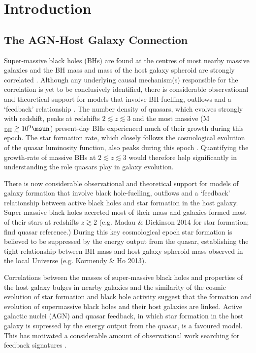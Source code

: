 
\chapter{Introduction}
\label{ch:intro}

\section{The AGN-Host Galaxy Connection}

Super-massive black holes (BHs) are found at the centres of most nearby massive galaxies and the BH mass and mass of the host galaxy spheroid are strongly correlated \citep{ferrarese00,gebhardt00,kormendy13}. 
Although any underlying causal mechanism(s) responsible for the correlation is yet to be conclusively identified, there is considerable observational and theoretical support for models that involve BH-fuelling, outflows and a `feedback' relationship \citep[e.g.][]{king15}.  
The number density of quasars, which evolves strongly with redshift, peaks at redshifts $2 \lesssim z \lesssim 3$ \citep[e.g.][]{brandt05,richards06b} and the most massive (M$_{\rm BH} \gtrsim 10^9\msun$) present-day BHs experienced much of their growth during this epoch.  
The star formation rate, which closely follows the cosmological evolution of the quasar luminosity function, also peaks during this epoch \citep[e.g.][]{boyle98}. 
Quantifying the growth-rate of massive BHs at $2 \lesssim z \lesssim 3$ would therefore help significantly in understanding the role quasars play in galaxy evolution.

There is now considerable observational and theoretical support for models of galaxy formation that involve black hole-fuelling, outflows and a ‘feedback’ relationship between active black holes and star formation in the host galaxy. 
Super-massive black holes accreted most of their mass and galaxies formed most of their stars at redshifts $z\gtrsim2$ (e.g. Madau \& Dickinson 2014 for star formation; find quasar reference.)
During this key cosmological epoch star formation is believed to be suppressed by the energy output from the quasar, establishing the tight relationship between BH mass and host galaxy spheroid mass observed in the local Universe (e.g. Kormendy \& Ho 2013). 

Correlations between the masses of super-massive black holes and properties of the host galaxy bulges in nearby galaxies \citep{gebhardt00,ferrarese00} and the similarity of the cosmic evolution of star formation and black hole activity \citep{boyle98,madau14} suggest that the formation and evolution of supermassive black holes and their host galaxies are linked. 
Active galactic nuclei (AGN) and quasar feedback, in which star formation in the host galaxy is supressed by the energy output from the quasar, is a favoured model.
This has motivated a considerable amount of observational work searching for feedback signatures \citep[for recent reviews, see][]{alexander12,fabian12,heckman14}. 

